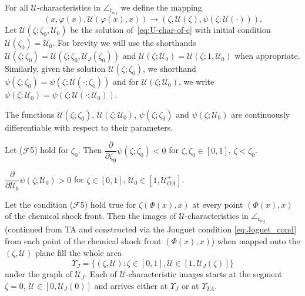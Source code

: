 \documentclass[10pt,a4paper]{amsart}
\begin{document}
\begin{definition}
\label{def:mapping_and_solution_shorthands}
For all $\mathcal U$-characteristics in $\angle_{t_{inj}}$ we define the mapping
\begin{equation}
\label{eq:mapping_into_zeta_U}
(x, \varphi(x), \mathcal U(\varphi(x), x)) \to (\zeta, \mathcal U(\zeta), \psi(\zeta; \mathcal U(\cdot))).
\end{equation}
Let $\mathcal U(\zeta;\zeta_0, \mathcal U_0)$ be the solution of~\eqref{eq:U-char-of-c} with initial condition $\mathcal U(\zeta_0) = \mathcal U_0$. For brevity we will use the shorthands $\mathcal U(\zeta;\zeta_0) = \mathcal U(\zeta;\zeta_0, \mathcal U_J(\zeta_0))$ and $\mathcal U(\zeta;\mathcal U_0) = \mathcal U(\zeta;1, \mathcal U_0)$ when appropriate. Similarly, given the solution $\mathcal U(\zeta;\zeta_0)$, we shorthand $\psi(\zeta; \zeta_0) = \psi(\zeta; \mathcal U(\cdot;\zeta_0))$ and for $\mathcal U(\zeta;\mathcal U_0)$, we write $\psi(\zeta;\mathcal U_0) = \psi(\zeta; \mathcal U(\cdot;\mathcal U_0))$.
\end{definition}

\begin{proposition}
\label{prop:continuous_differential_by_parameter}
The functions $\mathcal U(\zeta;\zeta_0)$, $\mathcal U(\zeta;\mathcal U_0)$, $\psi(\zeta; \zeta_0)$ and $\psi(\zeta;\mathcal U_0)$ are continuously differentiable with respect to their parameters.
\end{proposition}

\begin{lemma} 
\label{lemma:dpsi_dzeta0}
Let ($\mathcal F$5) hold for $\zeta_0$. Then 
$\dfrac{\partial}{\partial\zeta_0}\psi(\zeta;\zeta_0) < 0$ for $\zeta, \zeta_0 \in [0,1]$, $\zeta < \zeta_0$.
\end{lemma}

\begin{lemma}
\label{lemma:dpsi_dU0}
$\dfrac{\partial}{\partial \mathcal U_0}\psi(\zeta; \mathcal U_0) > 0$  for $\zeta\in[0,1]$, $\mathcal U_0\in[1, \mathcal U^+_{OA}]$.
\end{lemma}

\begin{proposition}
\label{prop:full_cover_of_zeta_U_plane}
Let the condition ($\mathcal F$5) hold true for $\zeta(\Phi(x), x)$ at every point $(\Phi(x), x)$  of the chemical shock front. Then the images of $\mathcal U$-characteristics in $\angle_{t_{inj}}$ (continued from TA and constructed via the Jouguet condition \eqref{eq:Joguet_cond} from each point of the chemical shock front $(\Phi(x),x)$) when mapped onto the $(\zeta, \mathcal U)$ plane fill the whole area
$$\overline {\Upsilon}_J = \{(\zeta, \mathcal U): \zeta\in[0,1], \mathcal U \in [1, \mathcal U_J(\zeta)]\}$$
under the graph of $\mathcal U_J$.
Each of $\mathcal U$-characteristic images starts at the segment $\zeta = 0$, $\mathcal U \in [0,\mathcal U_J(0)]$ and arrives either at $\Upsilon_J$ or at $\Upsilon_{TA}$.    
\end{proposition}
\end{document}
